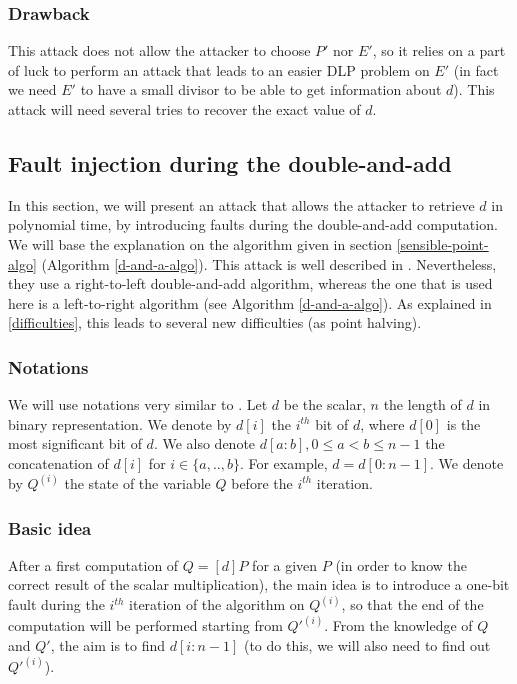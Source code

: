 \documentclass[journal]{IEEEtran}
\begin{document}
\subsubsection{Drawback}
This attack does not allow the attacker to choose $P'$ nor $E'$, so it relies on a part of luck to perform an attack
that leads to an easier DLP problem on $E'$ (in fact we need $E'$ to have a small divisor to be able to
get information about $d$). This attack will need several tries to recover the exact value of $d$.

\subsection{Fault injection during the double-and-add}
\label{attack-powa}
In this section, we will present an attack that allows the attacker to retrieve $d$ in polynomial time, by
introducing faults during the double-and-add computation. We will base the explanation on the algorithm given
in section \ref{sensible-point-algo} (Algorithm \ref{d-and-a-algo}). This attack is well described in \cite{biehl2000differential}.
Nevertheless, they use a right-to-left double-and-add algorithm, whereas the one that is used here is a left-to-right algorithm (see Algorithm \ref{d-and-a-algo}).
As explained in \ref{difficulties}, this leads to several new difficulties (as point halving).\\

\subsubsection{Notations}
We will use notations very similar to \cite{biehl2000differential}.
Let $d$ be the scalar, $n$ the length of $d$ in binary representation. We denote by $d[i]$ the $i^{th}$ bit of $d$, 
where $d[0]$ is the most significant bit of $d$. We also denote $d[a:b], 0 \leq a < b \leq n-1$ the concatenation of $d[i]$ for $i \in \{a, .., b\}$.
For example, $d = d[0:n-1]$.
We denote by $Q^{(i)}$ the state of the variable $Q$ before the $i^{th}$ iteration.\\

\subsubsection{Basic idea} 
After a first computation of $Q = [d]P$ for a given $P$ (in order to know the correct result of the scalar multiplication), the main idea 
is to introduce a one-bit fault during the $i^{th}$ iteration of the algorithm on $Q^{(i)}$, so that the end of the computation
will be performed starting from $Q'^{(i)}$. From the knowledge of $Q$ and $Q'$, the aim is to find $d[i:n-1]$ (to do this, we will also need 
to find out $Q'^{(i)}$).\\
\end{document}
